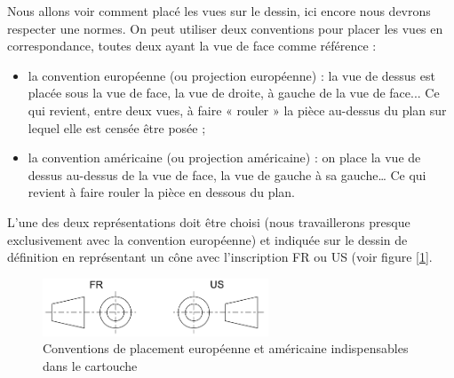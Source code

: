 \documentclass[
	11pt, %
	fleqn, %
	a4paper, %
]{LegrandOrangeBook}
\begin{document}
Nous allons voir comment placé les vues sur le dessin, ici encore nous devrons respecter une normes. On peut utiliser deux conventions pour placer les vues en correspondance, toutes deux ayant la vue de face comme référence :
\begin{definition}
    
\begin{itemize}
    \item la convention européenne (ou projection européenne) : la vue de dessus est placée sous la vue de face, la vue de droite, à gauche de la vue de face... Ce qui revient, entre deux vues, à faire « rouler » la pièce au-dessus du plan sur lequel elle est censée être posée ;
    \item la convention américaine (ou projection américaine) : on place la vue de dessus au-dessus de la vue de face, la vue de gauche à sa gauche… Ce qui revient à faire rouler la pièce en dessous du plan.
\end{itemize}

\end{definition}

L'une des deux représentations doit être choisi (nous travaillerons presque exclusivement avec la convention européenne) et indiquée sur le dessin de définition en représentant un cône avec l'inscription FR ou US (voir figure [\ref{conv}].

\begin{figure}[H] %
	\centering %
	\includegraphics[width=0.6\textwidth]{Images/conv.png} %
	\caption{Conventions de placement européenne et américaine indispensables dans le cartouche}
	\label{conv} %
\end{figure}
\end{document}
